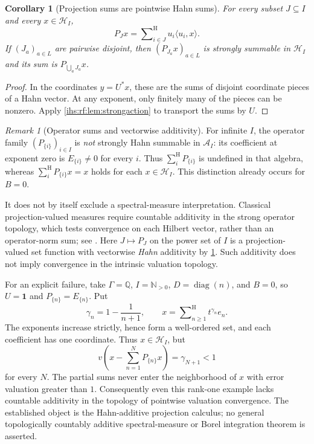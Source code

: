 \documentclass[11pt,a4paper]{article}
\numberwithin{equation}{section}
\newtheorem{corollary}[corollary]{Corollary}
\theoremstyle{definition}
\theoremstyle{remark}
\newtheorem{remark}[remark]{Remark}
\newcommand{\Q}{\mathbb Q}
\newcommand{\N}{\mathbb N}
\newcommand{\Hrf}{\mathcal H_I}
\newcommand{\Arf}{\mathcal A_I}
\newcommand{\diag}{\operatorname{diag}}
\newcommand{\Id}{\mathbf 1}
\newcommand{\sH}{\mathop{\sum}\nolimits^{\mathrm H}}
\newcommand{\ip}[2]{\langle#1,#2\rangle}
\begin{document}
\begin{corollary}[Projection sums are pointwise Hahn sums]\label{ihs:rf:cor:projsums}
For every subset $J\subseteq I$ and every $x\in\Hrf$,
\[
 P_Jx=\sH_{i\in J}u_i\ip{u_i}{x}.
\]
If $(J_a)_{a\in L}$ are pairwise disjoint, then $(P_{J_a}x)_{a\in L}$ is
strongly summable in $\Hrf$ and its sum is $P_{\bigcup_a J_a}x$.
\end{corollary}
\begin{proof}
In the coordinates $y=U^*x$, these are the sums of disjoint coordinate
pieces of a Hahn vector. At any exponent, only finitely many of the pieces
can be nonzero. Apply \cref{ihs:rf:lem:strongaction} to transport the sums
by $U$.
\end{proof}

\begin{remark}[Operator sums and vectorwise additivity]\label{ihs:rf:rem:notopsum}
For infinite $I$, the operator family $(P_{\{i\}})_{i\in I}$ is \emph{not}
strongly Hahn summable in $\Arf$: its coefficient at exponent zero is
$E_{\{i\}}\ne0$ for every $i$. Thus $\sH_iP_{\{i\}}$ is undefined in that
algebra, whereas $\sH_iP_{\{i\}}x=x$ holds for each $x\in\Hrf$.
This distinction already occurs for $B=0$.

It does not by itself exclude a spectral-measure interpretation.
Classical projection-valued measures require countable additivity in
the strong operator topology, which tests convergence on each Hilbert
vector, rather than an operator-norm sum; see
\cite[Definition~5.1 and footnote~18]{Williams}.
Here $J\mapsto P_J$ on the power set of $I$ is a projection-valued set
function with vectorwise \emph{Hahn} additivity by
\cref{ihs:rf:cor:projsums}. Such additivity does not imply convergence
in the intrinsic valuation topology.

For an explicit failure, take $\Gamma=\Q$, $I=\N_{>0}$, $D=\diag(n)$,
and $B=0$, so $U=\Id$ and $P_{\{n\}}=E_{\{n\}}$. Put
\[
 \gamma_n=1-\frac1{n+1},\qquad
 x=\sH_{n\ge1}t^{\gamma_n}e_n.
\]
The exponents increase strictly, hence form a well-ordered set, and
each coefficient has one coordinate. Thus $x\in\Hrf$, but
\[
 v\!\left(x-\sum_{n=1}^N P_{\{n\}}x\right)
 =\gamma_{N+1}<1
\]
for every $N$. The partial sums never enter the neighborhood of $x$
with error valuation greater than $1$. Consequently even this rank-one
example lacks countable additivity in the topology of pointwise
valuation convergence. The established object is the Hahn-additive
projection calculus; no general topologically countably additive
spectral-measure or Borel integration theorem is asserted.
\end{remark}
\end{document}
